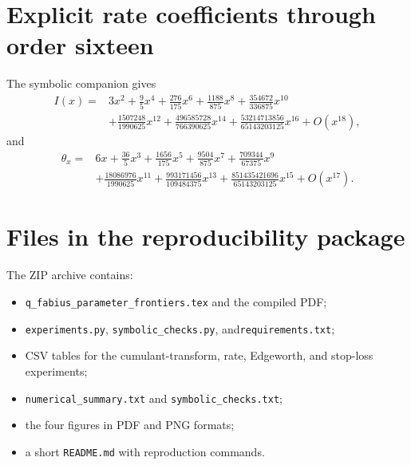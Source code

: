 \documentclass[11pt,a4paper]{article}
\theoremstyle{definition}
\newcommand{\1}{\mathbf{1}}
\begin{document}
\section{Explicit rate coefficients through order sixteen}

The symbolic companion gives
\begin{align*}
 I(x)={}&3x^2+\frac95x^4+\frac{276}{175}x^6
 +\frac{1188}{875}x^8+\frac{354672}{336875}x^{10}\\
 &+\frac{1507248}{1990625}x^{12}
 +\frac{496585728}{766390625}x^{14}
 +\frac{53214713856}{65143203125}x^{16}+O(x^{18}),
\end{align*}
and
\begin{align*}
 \theta_x={}&6x+\frac{36}{5}x^3+\frac{1656}{175}x^5
 +\frac{9504}{875}x^7+\frac{709344}{67375}x^9\\
 &+\frac{18086976}{1990625}x^{11}
 +\frac{993171456}{109484375}x^{13}
 +\frac{851435421696}{65143203125}x^{15}+O(x^{17}).
\end{align*}

\section{Files in the reproducibility package}

The ZIP archive contains:
\begin{itemize}
\item \texttt{q\_fabius\_parameter\_frontiers.tex} and the compiled PDF;
\item \texttt{experiments.py}, \texttt{symbolic\_checks.py}, and\linebreak[1] \texttt{requirements.txt};
\item CSV tables for the cumulant-transform, rate, Edgeworth, and stop-loss
experiments;
\item \texttt{numerical\_summary.txt} and
\texttt{symbolic\_checks.txt};
\item the four figures in PDF and PNG formats;
\item a short \texttt{README.md} with reproduction commands.
\end{itemize}
\end{document}
